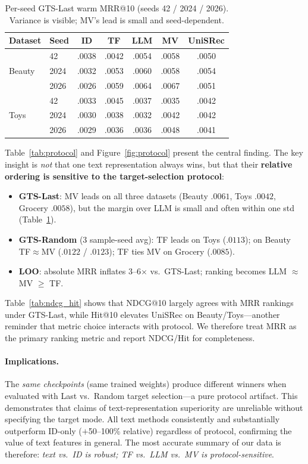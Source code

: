 \documentclass[sigconf,natbib=true,anonymous]{acmart}
\begin{document}
\begin{table}[t]
\centering
\caption{%
Per-seed GTS-Last warm MRR@10 (seeds 42 / 2024 / 2026).
Variance is visible; MV's lead is small and seed-dependent.%
}
\label{tab:perseed}
\small
\setlength{\tabcolsep}{3.5pt}
\begin{tabular}{@{}llccccc@{}}
\toprule
Dataset & Seed & ID & TF & LLM & MV & UniSRec \\
\midrule
\multirow{3}{*}{Beauty}
 & 42    & .0038 & .0042 & .0054 & .0058 & .0050 \\
 & 2024  & .0032 & .0053 & .0060 & .0058 & .0054 \\
 & 2026  & .0026 & .0059 & .0064 & .0067 & .0051 \\
\midrule
\multirow{3}{*}{Toys}
 & 42    & .0033 & .0045 & .0037 & .0035 & .0042 \\
 & 2024  & .0030 & .0038 & .0032 & .0042 & .0042 \\
 & 2026  & .0029 & .0036 & .0036 & .0048 & .0041 \\
\bottomrule
\end{tabular}
\end{table}

Table~\ref{tab:protocol} and Figure~\ref{fig:protocol} present the central finding.
The key insight is \emph{not} that one text representation always wins, but that their \textbf{relative ordering is sensitive to the target-selection protocol}:

\begin{itemize}[leftmargin=*,itemsep=1pt]
\item \textbf{GTS-Last}: MV leads on all three datasets (Beauty $.0061$, Toys $.0042$, Grocery $.0058$), but the margin over LLM is small and often within one std (Table~\ref{tab:perseed}).
\item \textbf{GTS-Random} (3 sample-seed avg): TF leads on Toys ($.0113$); on Beauty TF$\approx$MV ($.0122$ / $.0123$); TF ties MV on Grocery ($.0085$).
\item \textbf{LOO}: absolute MRR inflates 3--6$\times$ vs.\ GTS-Last; ranking becomes LLM $\approx$ MV $\ge$ TF.
\end{itemize}

Table~\ref{tab:ndcg_hit} shows that NDCG@10 largely agrees with MRR rankings under GTS-Last, while Hit@10 elevates UniSRec on Beauty/Toys---another reminder that metric choice interacts with protocol.
We therefore treat MRR as the primary ranking metric and report NDCG/Hit for completeness.

\paragraph{Implications.}
The \emph{same checkpoints} (same trained weights) produce different winners when evaluated with Last vs.\ Random target selection---a pure protocol artifact.
This demonstrates that claims of text-representation superiority are unreliable without specifying the target mode.
All text methods consistently and substantially outperform ID-only ($+$50--100\% relative) regardless of protocol, confirming the value of text features in general.
The most accurate summary of our data is therefore: \emph{text vs.\ ID is robust; TF vs.\ LLM vs.\ MV is protocol-sensitive}.
\end{document}
